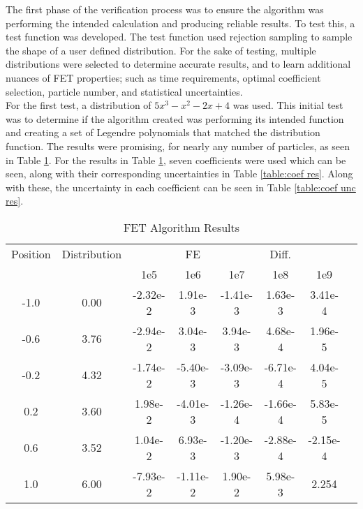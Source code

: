 \documentclass[10tma4paper]{article}
\begin{document}
The first phase of the verification process was to ensure the algorithm was performing the intended calculation and producing reliable results. To test this, a test function was developed. The test function used rejection sampling to sample the shape of a user defined distribution. For the sake of testing, multiple distributions were selected to determine accurate results, and to learn additional nuances of FET properties; such as time requirements, optimal coefficient selection, particle number, and statistical uncertainties.
\\
For the first test, a distribution of $5x^{3}-x^{2}-2x+4$ was used. This initial test was to determine if the algorithm created was performing its intended function and creating a set of Legendre polynomials that matched the distribution function. The results were promising, for nearly any number of particles, as seen in Table \ref{table:alg res}. For the results in Table \ref{table:alg res}, seven coefficients were used which can be seen, along with their corresponding uncertainties in Table \ref{table:coef res}. Along with these, the uncertainty in each coefficient can be seen in Table \ref{table:coef unc res}.
\begin{table}[!htbp]
	\caption{FET Algorithm Results}
	\centering
	\begin{tabular}{c c c c c c c c}
		\hline
		Position & Distribution &  & FE &  & Diff. &  &\\[0.5ex]
		 & & 1e5 & 1e6 & 1e7 & 1e8 & 1e9 &\\
		 \hline
		 \hline
		-1.0 & 0.00 & -2.32e-2 & 1.91e-3  & -1.41e-3 & 1.63e-3  & 3.41e-4  & \\
		-0.6 & 3.76 & -2.94e-2 & 3.04e-3  & 3.94e-3  & 4.68e-4  & 1.96e-5  & \\
		-0.2 & 4.32 & -1.74e-2 & -5.40e-3 & -3.09e-3 & -6.71e-4 & 4.04e-5  & \\
		 0.2 & 3.60 & 1.98e-2  & -4.01e-3 & -1.26e-4 & -1.66e-4 & 5.83e-5  & \\
		 0.6 & 3.52 & 1.04e-2  & 6.93e-3  & -1.20e-3 & -2.88e-4 & -2.15e-4 & \\
		 1.0 & 6.00 & -7.93e-2 & -1.11e-2 & 1.90e-2  & 5.98e-3  & 2.254    & \\ [1ex]
		\hline
	\end{tabular}
	\label{table:alg res}
\end{table}
\end{document}
